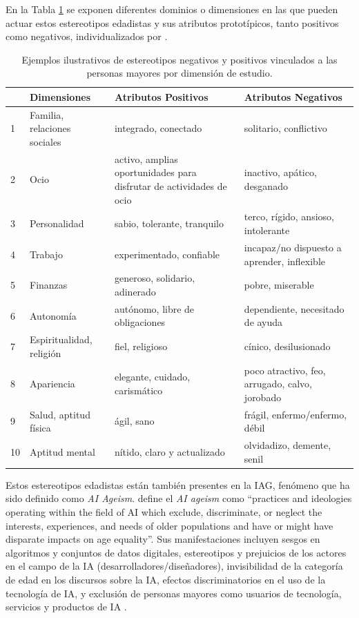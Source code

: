 \documentclass[spanish]{textolivre}
\begin{document}
En la Tabla \ref{tab-1} se exponen diferentes dominios o dimensiones en las que pueden actuar estos estereotipos edadistas y sus atributos prototípicos, tanto positivos como negativos, individualizados por \textcite{rothermund2024}.

\begin{table}[h!]
\centering
\begin{threeparttable}
\caption{Ejemplos ilustrativos de estereotipos negativos y positivos vinculados a las personas mayores por dimensión de estudio.}\label{tab-1}
\begin{tabular}{llp{4cm}p{4.5cm}}
\toprule
 & Dimensiones & Atributos Positivos & Atributos Negativos \\
\midrule
1 & Familia, relaciones sociales & integrado, conectado & solitario, conflictivo \\
2 & Ocio & activo, amplias oportunidades para disfrutar de actividades de ocio & inactivo, apático, desganado \\
3 & Personalidad & sabio, tolerante, tranquilo & terco, rígido, ansioso, intolerante \\
4 & Trabajo & experimentado, confiable & incapaz/no dispuesto a aprender, inflexible \\
5 & Finanzas & generoso, solidario, adinerado & pobre, miserable \\
6 & Autonomía & autónomo, libre de obligaciones & dependiente, necesitado de ayuda \\
7 & Espiritualidad, religión & fiel, religioso & cínico, desilusionado \\
8 & Apariencia & elegante, cuidado, carismático & poco atractivo, feo, arrugado, calvo, jorobado \\
9 & Salud, aptitud física & ágil, sano & frágil, enfermo/enfermo, débil \\
10 & Aptitud mental & nítido, claro y actualizado & olvidadizo, demente, senil \\
\bottomrule
\end{tabular}
\end{threeparttable}
\end{table}

Estos estereotipos edadistas están también presentes en la IAG, fenómeno que ha sido definido como \textit{AI Ageism}. \textcite[p. 669]{stypinska2023} define el \textit{AI ageism} como ``practices and ideologies operating within the field of AI which exclude, discriminate, or neglect the interests, experiences, and needs of older populations and have or might have disparate impacts on age equality''. Sus manifestaciones incluyen sesgos en algoritmos y conjuntos de datos digitales, estereotipos y prejuicios de los actores en el campo de la IA (desarrolladores/diseñadores), invisibilidad de la categoría de edad en los discursos sobre la IA, efectos discriminatorios en el uso de la tecnología de IA, y exclusión de personas mayores como usuarios de tecnología, servicios y productos de IA \cite{stypinska2021}.
\end{document}

